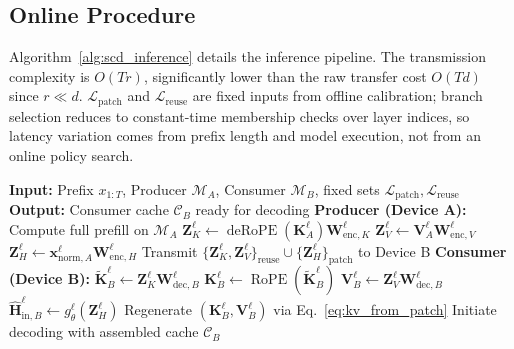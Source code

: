 \documentclass{article}
\theoremstyle{plain}
\theoremstyle{definition}
\theoremstyle{remark}
\begin{document}
\subsection{Online Procedure}
\label{subsec:online_proc}

Algorithm~\ref{alg:scd_inference} details the inference pipeline.
The transmission complexity is $O(Tr)$, significantly lower than the raw transfer cost $O(Td)$ since $r \ll d$.
$\mathcal{L}_{\mathrm{patch}}$ and $\mathcal{L}_{\mathrm{reuse}}$ are fixed inputs from offline calibration; branch selection reduces to constant-time membership checks over layer indices, so latency variation comes from prefix length and model execution, not from an online policy search.

\begin{algorithm}[t]
\caption{Split Inference with Reuse and Patch}
\label{alg:scd_inference}
\begin{algorithmic}
  \STATE \textbf{Input:} Prefix $x_{1:T}$, Producer $\mathcal{M}_A$, Consumer $\mathcal{M}_B$, fixed sets $\mathcal{L}_{\mathrm{patch}}, \mathcal{L}_{\mathrm{reuse}}$
  \STATE \textbf{Output:} Consumer cache $\mathcal{C}_B$ ready for decoding
  \STATE \textbf{Producer (Device A):}
  \STATE Compute full prefill on $\mathcal{M}_A$
    \STATE $\mathbf{Z}_K^\ell \leftarrow \operatorname{deRoPE}(\mathbf{K}_A^\ell) \mathbf{W}_{\mathrm{enc}, K}^\ell$
    \STATE $\mathbf{Z}_V^\ell \leftarrow \mathbf{V}_A^\ell \mathbf{W}_{\mathrm{enc}, V}^\ell$
  \ENDFOR
    \STATE $\mathbf{Z}_H^{\ell} \leftarrow \mathbf{x}^{\ell}_{\mathrm{norm}, A} \mathbf{W}_{\mathrm{enc}, H}^{\ell}$
  \ENDFOR
  \STATE Transmit $\{\mathbf{Z}_K^\ell, \mathbf{Z}_V^\ell\}_{\text{reuse}} \cup \{\mathbf{Z}_H^{\ell}\}_{\text{patch}}$ to Device B
  \STATE \hrulefill
  \STATE \textbf{Consumer (Device B):}
    \STATE $\tilde{\mathbf{K}}_{B}^\ell \leftarrow \mathbf{Z}_K^\ell \mathbf{W}_{\mathrm{dec}, B}^\ell$
    \STATE $\mathbf{K}_{B}^\ell \leftarrow \operatorname{RoPE}(\tilde{\mathbf{K}}_{B}^\ell)$
    \STATE $\mathbf{V}_{B}^\ell \leftarrow \mathbf{Z}_V^\ell \mathbf{W}_{\mathrm{dec}, B}^\ell$
  \ENDFOR
    \STATE $\hat{\mathbf{H}}_{\mathrm{in}, B}^\ell \leftarrow g_{\theta}^{\ell}(\mathbf{Z}_H^{\ell})$
    \STATE Regenerate $(\mathbf{K}_B^\ell, \mathbf{V}_B^\ell)$ via Eq.~\eqref{eq:kv_from_patch}
  \ENDFOR
  \STATE Initiate decoding with assembled cache $\mathcal{C}_B$
\end{algorithmic}
\end{algorithm}
\end{document}
